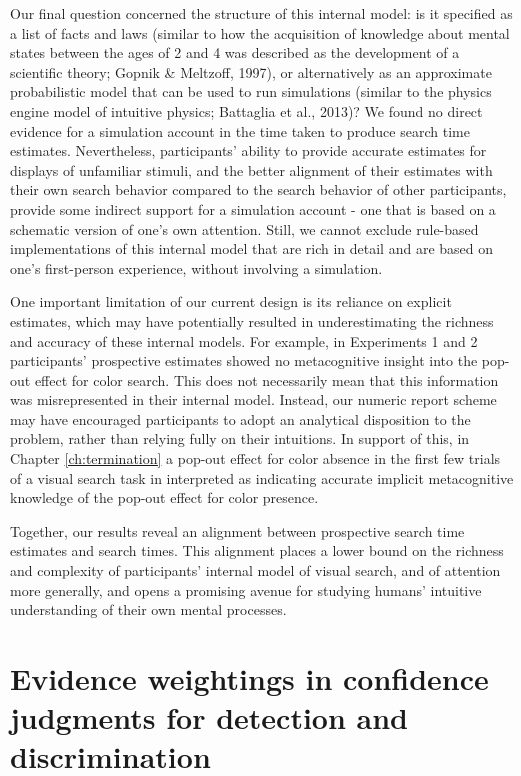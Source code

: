 \documentclass[12pt,twoside]{reedthesis}
\begin{document}
Our final question concerned the structure of this internal model: is it specified as a list of facts and laws (similar to how the acquisition of knowledge about mental states between the ages of 2 and 4 was described as the development of a scientific theory; Gopnik \& Meltzoff, 1997), or alternatively as an approximate probabilistic model that can be used to run simulations (similar to the physics engine model of intuitive physics; Battaglia et al., 2013)? We found no direct evidence for a simulation account in the time taken to produce search time estimates. Nevertheless, participants' ability to provide accurate estimates for displays of unfamiliar stimuli, and the better alignment of their estimates with their own search behavior compared to the search behavior of other participants, provide some indirect support for a simulation account - one that is based on a schematic version of one's own attention. Still, we cannot exclude rule-based implementations of this internal model that are rich in detail and are based on one's first-person experience, without involving a simulation.

One important limitation of our current design is its reliance on explicit estimates, which may have potentially resulted in underestimating the richness and accuracy of these internal models. For example, in Experiments 1 and 2 participants' prospective estimates showed no metacognitive insight into the pop-out effect for color search. This does not necessarily mean that this information was misrepresented in their internal model. Instead, our numeric report scheme may have encouraged participants to adopt an analytical disposition to the problem, rather than relying fully on their intuitions. In support of this, in Chapter \ref{ch:termination} a pop-out effect for color absence in the first few trials of a visual search task in interpreted as indicating accurate implicit metacognitive knowledge of the pop-out effect for color presence.

Together, our results reveal an alignment between prospective search time estimates and search times. This alignment places a lower bound on the richness and complexity of participants' internal model of visual search, and of attention more generally, and opens a promising avenue for studying humans' intuitive understanding of their own mental processes.

\hypertarget{ch:RC}{%
\chapter{Evidence weightings in confidence judgments for detection and discrimination}\label{ch:RC}}
\end{document}
